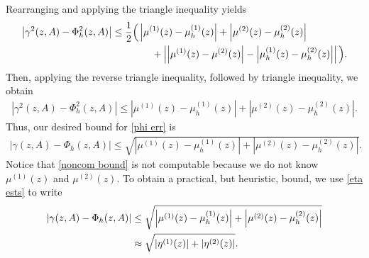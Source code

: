 Rearranging and applying the triangle inequality yields
\begin{align}
    \left| \gamma^2(z,A) - \Phi_h^2(z,A) \right|
    &\leq \frac{1}{2} \Big(
    \left|\mu^{(1)}(z)-\mu_h^{(1)}(z)\right|
    + \left|\mu^{(2)}(z)-\mu_h^{(2)}(z)\right| \notag\\
    &\qquad\qquad
    + \left|
    \left|\mu^{(1)}(z)-\mu^{(2)}(z)\right|
    - \left|\mu_h^{(1)}(z)-\mu_h^{(2)}(z)\right|
    \right|
    \Big).
\end{align}
Then, applying the reverse triangle inequality, followed by triangle inequality, we obtain 
\begin{align}
    \left| \gamma^2(z, A) - \Phi_h^2(z, A) \right| \le \left|\mu^{(1)}(z)-\mu_h^{(1)}(z) \right| + \left|\mu^{(2)}(z)-\mu_h^{(2)}(z) \right|.
\end{align}
Thus, our desired bound for \eqref{phi err} is 
\begin{align} \label{noncom bound}
    \left| \gamma(z, A) - \Phi_h(z, A) \right| \le \sqrt{\left|\mu^{(1)}(z)-\mu_h^{(1)}(z) \right| + \left|\mu^{(2)}(z)-\mu_h^{(2)}(z) \right|}.
\end{align}
Notice that \eqref{noncom bound} is not computable because we do not know $\mu^{(1)}(z)$ and $\mu^{(2)}(z).$ To obtain a practical, but heuristic, bound, we use \eqref{eta ests} to write 
\begin{align} \label{pract bound}
    |\gamma(z,A)-\Phi_h(z,A)|
    &\leq
    \sqrt{\left|\mu^{(1)}(z)-\mu_h^{(1)}(z)\right|
    + \left|\mu^{(2)}(z)-\mu_h^{(2)}(z)\right| }
    \notag\\
    &\approx
    \sqrt{|\eta^{(1)}(z)|
    +
    |\eta^{(2)}(z)|}.
\end{align}

